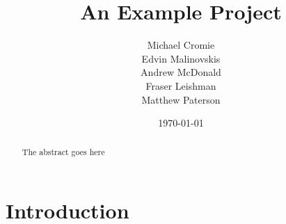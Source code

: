 \documentclass{l3proj}
\begin{document}
\title{An Example Project}
\author{Michael Cromie\\
        Edvin Malinovskis \\
        Andrew McDonald  \\
        Fraser Leishman \\
        Matthew Paterson \\
        }
\date{\today}
\maketitle
\begin{abstract}

The abstract goes here

\end{abstract}
\educationalconsent
\tableofcontents
\chapter{Introduction}
\label{intro}
\end{document}
